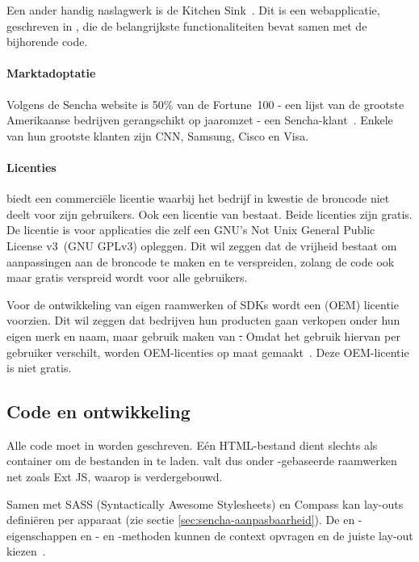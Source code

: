 Een ander handig naslagwerk is de Kitchen Sink~\cite{Inc.2013}.  
Dit is een webapplicatie,  geschreven in \st{},  die de belangrijkste functionaliteiten bevat samen met de bijhorende code. 

\paragraph{Marktadoptatie}
Volgens de Sencha website is 50\% van de Fortune~100 - een lijst van de grootste Amerikaanse bedrijven gerangschikt op jaaromzet - een Sencha-klant~\cite{Inc.}.  
Enkele van hun grootste klanten zijn CNN,  Samsung,  Cisco en  Visa.

\paragraph{Licenties}
\st{} biedt een commerciële licentie waarbij het bedrijf in kwestie de broncode niet deelt voor zijn gebruikers.  
Ook een  licentie van \st{} bestaat.
Beide licenties zijn gratis.
De  licentie is voor applicaties die zelf een GNU's Not Unix General Public License v3~(GNU GPLv3) opleggen.
Dit wil zeggen dat de vrijheid bestaat om aanpassingen aan de broncode te maken en te verspreiden,  zolang de code ook maar gratis verspreid wordt voor alle gebruikers.
  
Voor de ontwikkeling van eigen raamwerken of SDKs wordt een  (OEM) licentie voorzien.  
Dit wil zeggen dat bedrijven hun producten gaan verkopen onder hun eigen merk en naam, maar gebruik maken van \st.  
Omdat het gebruik hiervan per gebruiker verschilt,  worden OEM-licenties op maat gemaakt~\cite{Inc.}.
Deze OEM-licentie is niet gratis.

\subsection{Code en ontwikkeling}
Alle code moet in \js{} worden geschreven.
Eén HTML-bestand dient slechts als container om de bestanden in te laden.  
\st{} valt dus onder \js{}-gebaseerde raamwerken net zoals Ext JS,  waarop \st{} is verdergebouwd.

Samen met SASS (Syntactically Awesome Stylesheets) en Compass kan \st{} lay-outs definiëren per apparaat (zie sectie \ref{sec:sencha-aanpasbaarheid}).  
De  en -eigenschappen en - en -methoden kunnen de context opvragen en de juiste lay-out kiezen~\cite{JohnEClark2012}.

